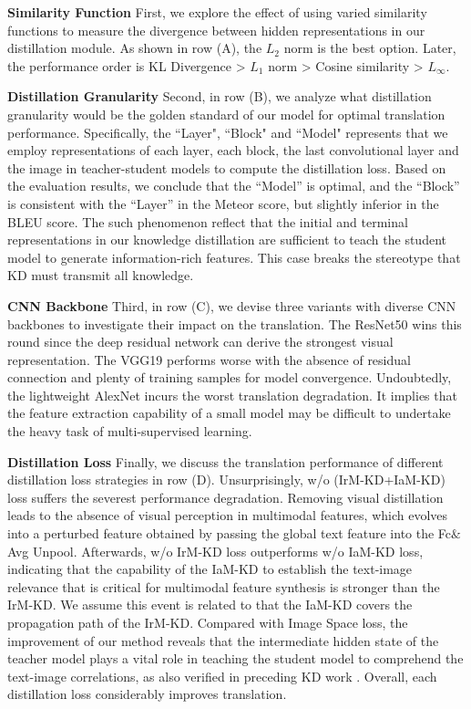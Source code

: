 \documentclass[11pt]{article}
\begin{document}
\textbf{Similarity Function}
First, we explore the effect of using varied similarity functions to measure the divergence between hidden representations in our distillation module.
As shown in row (A), the ${L_2}$ norm is the best option.
Later, the performance order is KL Divergence \cite{kullback1951information} > ${L_1}$ norm > Cosine similarity > ${L_\infty }$.

\textbf{Distillation Granularity}
Second, in row (B), we analyze what distillation granularity would be the golden standard of our model for optimal translation performance.
Specifically, the ``Layer", ``Block" and ``Model" represents that we employ representations of each layer, each block, the last convolutional layer and the image in teacher-student models to compute the distillation loss.
Based on the evaluation results, we conclude that the ``Model'' is optimal, and the ``Block'' is consistent with the ``Layer'' in the Meteor score, but slightly inferior in the BLEU score.
The such phenomenon reflect that the initial and terminal representations in our knowledge distillation are sufficient to teach the student model to generate information-rich features. This case breaks the stereotype that KD must transmit all knowledge.

\textbf{CNN Backbone}
Third, in row (C), we devise three variants with diverse CNN backbones to investigate their impact on the translation.
The ResNet50 wins this round since the deep residual network can derive the strongest visual representation.
The VGG19 performs worse with the absence of residual connection and plenty of training samples for model convergence.
Undoubtedly, the lightweight AlexNet incurs the worst translation degradation.
It implies that the feature extraction capability of a small model may be difficult to undertake the heavy task of multi-supervised learning.

\textbf{Distillation Loss}
Finally, we discuss the translation performance of different distillation loss strategies in row (D).
Unsurprisingly, w/o (IrM-KD+IaM-KD) loss suffers the severest performance degradation.
Removing visual distillation leads to the absence of visual perception in multimodal features, which evolves into a perturbed feature obtained by passing the global text feature into the Fc$\&$Avg Unpool.
Afterwards, w/o IrM-KD loss outperforms w/o IaM-KD loss, indicating that the capability of the IaM-KD to establish the text-image relevance that is critical for multimodal feature synthesis is stronger than the IrM-KD.
We assume this event is related to that the IaM-KD covers the propagation path of the IrM-KD.
Compared with Image Space loss, the improvement of our method reveals that the intermediate hidden state of the teacher model plays a vital role in teaching the student model to comprehend the text-image correlations, as also verified in preceding KD work \cite{romero2014fitnets,yim2017gift}.
Overall, each distillation loss considerably improves translation.
\end{document}
